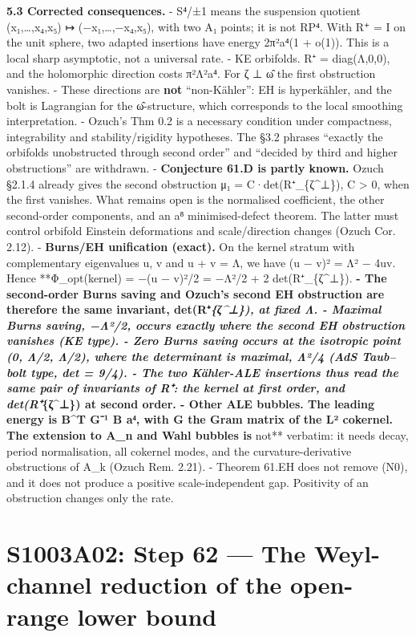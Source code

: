 \documentclass[
  10pt,
]{report}
\begin{document}
\textbf{5.3 Corrected consequences.} - S⁴/±1 means the suspension
quotient (x₁,\ldots,x₄,x₅) ↦ (−x₁,\ldots,−x₄,x₅), with two A₁ points; it
is not RP⁴. With R⁺ = I on the unit sphere, two adapted insertions have
energy 2π²a⁴(1 + o(1)). This is a local sharp asymptotic, not a
universal rate. - KE orbifolds. R⁺ = diag(Λ,0,0), and the holomorphic
direction costs π²Λ²a⁴. For ζ ⊥ ω̂ the first obstruction vanishes. -
These directions are \textbf{not} ``non-Kähler'': EH is hyperkähler, and
the bolt is Lagrangian for the ω̂-structure, which corresponds to the
local smoothing interpretation. - Ozuch's Thm 0.2 is a necessary
condition under compactness, integrability and stability/rigidity
hypotheses. The §3.2 phrases ``exactly the orbifolds unobstructed
through second order'' and ``decided by third and higher obstructions''
are withdrawn. - \textbf{Conjecture 61.D is partly known.} Ozuch §2.1.4
already gives the second obstruction μ₁ = C·det(R⁺\textbar\_\{ζ\^{}⊥\}),
C \textgreater{} 0, when the first vanishes. What remains open is the
normalised coefficient, the other second-order components, and an a⁸
minimised-defect theorem. The latter must control orbifold Einstein
deformations and scale/direction changes (Ozuch Cor. 2.12). -
\textbf{Burns/EH unification (exact).} On the kernel stratum with
complementary eigenvalues u, v and u + v = Λ, we have (u − v)² = Λ² −
4uv. Hence **Φ\_opt(kernel) = −(u − v)²/2 = −Λ²/2 + 2
det(R⁺\textbar\_\{ζ\^{}⊥\}).\textbf{ - The second-order Burns saving and
Ozuch's second EH obstruction are therefore the same invariant,
det(R⁺\textbar{}\emph{\{ζ\^{}⊥\}), at fixed Λ. - Maximal Burns saving,
−Λ²/2, occurs exactly where the second EH obstruction vanishes (KE
type). - Zero Burns saving occurs at the isotropic point (0, Λ/2, Λ/2),
where the determinant is maximal, Λ²/4 (AdS Taub--bolt type, det = 9/4).
- The two Kähler-ALE insertions thus read the same pair of invariants of
R⁺: the kernel at first order, and det(R⁺\textbar{}}\{ζ\^{}⊥\}) at
second order. - Other ALE bubbles. The leading energy is B\^{}T G⁻¹ B
a⁴, with G the Gram matrix of the L² cokernel. The extension to A\_n and
Wahl bubbles is }not** verbatim: it needs decay, period normalisation,
all cokernel modes, and the curvature-derivative obstructions of A\_k
(Ozuch Rem. 2.21). - Theorem 61.EH does not remove (N0), and it does not
produce a positive scale-independent gap. Positivity of an obstruction
changes only the rate.

\hypertarget{s1003a02-step-62-the-weyl-channel-reduction-of-the-open-range-lower-bound}{%
\chapter{S1003A02: Step 62 --- The Weyl-channel reduction of the
open-range lower
bound}\label{s1003a02-step-62-the-weyl-channel-reduction-of-the-open-range-lower-bound}}
\end{document}
